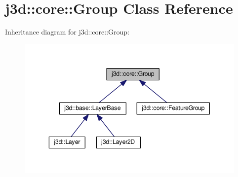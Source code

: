 \hypertarget{classj3d_1_1core_1_1Group}{}\section{j3d\+:\+:core\+:\+:Group Class Reference}
\label{classj3d_1_1core_1_1Group}


Inheritance diagram for j3d\+:\+:core\+:\+:Group\+:
\nopagebreak
\begin{figure}[H]
\begin{center}
\leavevmode
\includegraphics[width=343pt]{classj3d_1_1core_1_1Group__inherit__graph}
\end{center}
\end{figure}
